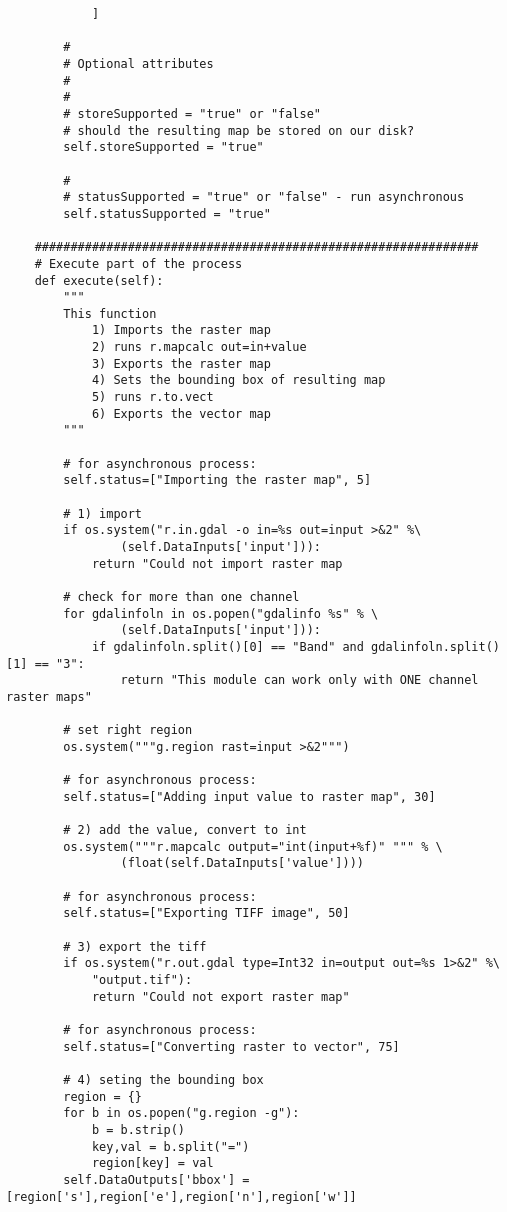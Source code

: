 \documentclass[a4paper,11pt]{article}
\begin{document}
\begin{verbatim}
            ]

        #
        # Optional attributes
        #
        #
        # storeSupported = "true" or "false" 
        # should the resulting map be stored on our disk?
        self.storeSupported = "true"

        #
        # statusSupported = "true" or "false" - run asynchronous
        self.statusSupported = "true"

    ##############################################################
    # Execute part of the process
    def execute(self):
        """
        This function
            1) Imports the raster map
            2) runs r.mapcalc out=in+value
            3) Exports the raster map
            4) Sets the bounding box of resulting map
            5) runs r.to.vect
            6) Exports the vector map
        """

        # for asynchronous process:
        self.status=["Importing the raster map", 5]

        # 1) import
        if os.system("r.in.gdal -o in=%s out=input >&2" %\
                (self.DataInputs['input'])):
            return "Could not import raster map

        # check for more than one channel
        for gdalinfoln in os.popen("gdalinfo %s" % \
                (self.DataInputs['input'])):
            if gdalinfoln.split()[0] == "Band" and gdalinfoln.split()[1] == "3":
                return "This module can work only with ONE channel raster maps"

        # set right region
        os.system("""g.region rast=input >&2""")

        # for asynchronous process:
        self.status=["Adding input value to raster map", 30]

        # 2) add the value, convert to int
        os.system("""r.mapcalc output="int(input+%f)" """ % \
                (float(self.DataInputs['value'])))

        # for asynchronous process:
        self.status=["Exporting TIFF image", 50]

        # 3) export the tiff
        if os.system("r.out.gdal type=Int32 in=output out=%s 1>&2" %\
            "output.tif"):
            return "Could not export raster map"

        # for asynchronous process:
        self.status=["Converting raster to vector", 75]

        # 4) seting the bounding box
        region = {}
        for b in os.popen("g.region -g"):
            b = b.strip()
            key,val = b.split("=")
            region[key] = val
        self.DataOutputs['bbox'] = [region['s'],region['e'],region['n'],region['w']]


\end{verbatim}
\end{document}
